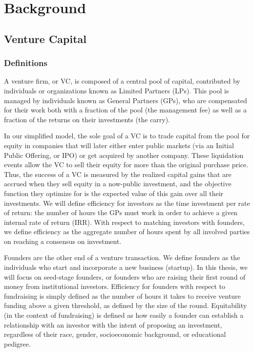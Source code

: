 \chapter{Background}
\label{ch:ch2}

\section{Venture Capital}

\subsection{Definitions}
\label{ch2:definitions}

A venture firm, or VC, is composed of a central pool of capital, contributed by individuals or organizations known as Limited Partners (LPs). This pool is managed by individuals known as General Partners (GPs), who are compensated for their work both with a fraction of the pool (the management fee) as well as a fraction of the returns on their investments (the carry).

In our simplified model, the sole goal of a VC is to trade capital from the pool for equity in companies that will later either enter public markets (via an Initial Public Offering, or IPO) or get acquired by another company. These liquidation events allow the VC to sell their equity for more than the original purchase price. Thus, the success of a VC is measured by the realized capital gains that are accrued when they sell equity in a now-public investment, and the objective function they optimize for is the expected value of this gain over all their investments. We will define efficiency for investors as the time investment per rate of return: the number of hours the GPs must work in order to achieve a given internal rate of return (IRR). With respect to matching investors with founders, we define efficiency as the aggregate number of hours spent by all involved parties on reaching a consensus on investment.

Founders are the other end of a venture transaction. We define founders as the individuals who start and incorporate a new business (startup). In this thesis, we will focus on seed-stage founders, or founders who are raising their first round of money from institutional investors. Efficiency for founders with respect to fundraising is simply defined as the number of hours it takes to receive venture funding above a given threshold, as defined by the size of the round. Equitability (in the context of fundraising) is defined as how easily a founder can establish a relationship with an investor with the intent of proposing an investment, regardless of their race, gender, socioeconomic background, or educational pedigree.

